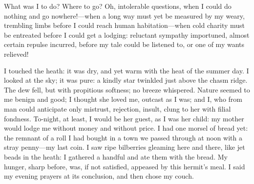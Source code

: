 What was I to do? Where to go? Oh, intolerable questions, when I could
do nothing and go nowhere!---when a long way must yet be measured by my
weary, trembling limbs before I could reach human habitation---when cold
charity must be entreated before I could get a lodging: reluctant
sympathy importuned, almost certain repulse incurred, before my tale
could be listened to, or one of my wants relieved!

I touched the heath: it was dry, and yet warm with the heat of the
summer day. I looked at the sky; it was pure: a kindly star twinkled
just above the chasm ridge. The dew fell, but with propitious softness;
no breeze whispered. Nature seemed to me benign and good; I thought she
loved me, outcast as I was; and I, who from man could anticipate only
mistrust, rejection, insult, clung to her with filial fondness.
To-night, at least, I would be her guest, as I was her child: my mother
would lodge me without money and without price. I had one morsel of
bread yet: the remnant of a roll I had bought in a town we passed
through at noon with a stray penny---my last coin. I saw ripe
bilberries gleaming here and there, like jet beads in the heath: I
gathered a handful and ate them with the bread. My hunger, sharp
before, was, if not satisfied, appeased by this hermit's meal. I said
my evening prayers at its conclusion, and then chose my couch.

